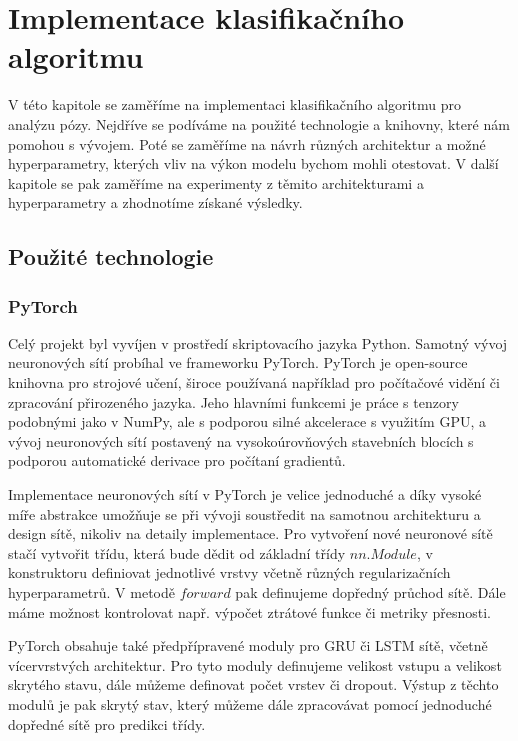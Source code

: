 \chapter{Implementace klasifikačního algoritmu}
\label{chap:ClassificationImplementation}

V této kapitole se zaměříme na implementaci klasifikačního algoritmu pro
analýzu pózy. Nejdříve se podíváme na použité technologie a knihovny, které nám
pomohou s vývojem. Poté se zaměříme na návrh různých architektur a možné
hyperparametry, kterých vliv na výkon modelu bychom mohli otestovat. V další
kapitole se pak zaměříme na experimenty z těmito architekturami a
hyperparametry a zhodnotíme získané výsledky.

\section{Použité technologie}

\subsection{PyTorch}

Celý projekt byl vyvíjen v prostředí skriptovacího jazyka Python. Samotný vývoj
neuronových sítí probíhal ve frameworku PyTorch. PyTorch je open-source
knihovna pro strojové učení, široce používaná například pro počítačové vidění
či zpracování přirozeného jazyka. Jeho hlavními funkcemi je práce s tenzory
podobnými jako v NumPy, ale s podporou silné akcelerace s využitím GPU, a vývoj
neuronových sítí postavený na vysokoúrovňových stavebních blocích s podporou
automatické derivace pro počítaní gradientů.

Implementace neuronových sítí v PyTorch je velice jednoduché a díky vysoké míře
abstrakce umožňuje se při vývoji soustředit na samotnou architekturu a design
sítě, nikoliv na detaily implementace. Pro vytvoření nové neuronové sítě stačí
vytvořit třídu, která bude dědit od základní třídy $nn.Module$, v konstruktoru
definiovat jednotlivé vrstvy včetně různých regularizačních hyperparametrů. V
metodě $forward$ pak definujeme dopředný průchod sítě. Dále máme možnost
kontrolovat např. výpočet ztrátové funkce či metriky přesnosti.

PyTorch obsahuje také předpřípravené moduly pro GRU či LSTM sítě, včetně
vícervrstvých architektur. Pro tyto moduly definujeme velikost vstupu a
velikost skrytého stavu, dále můžeme definovat počet vrstev či dropout. Výstup
z těchto modulů je pak skrytý stav, který můžeme dále zpracovávat pomocí
jednoduché dopředné sítě pro predikci třídy.

